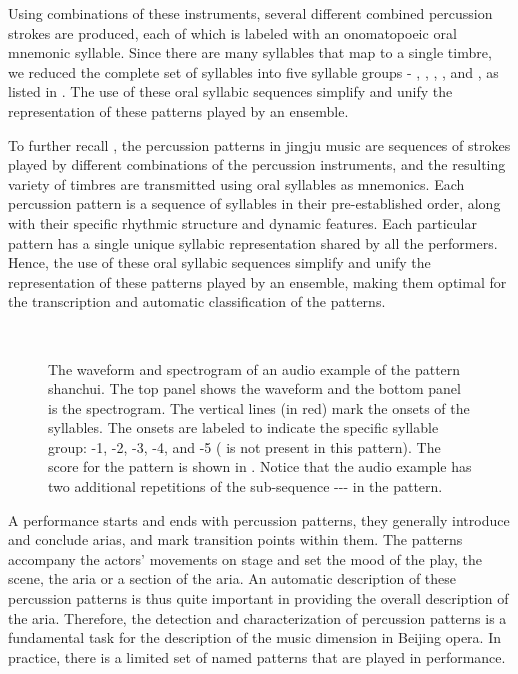 Using combinations of these instruments, several different combined percussion strokes are produced, each of which is labeled with an onomatopoeic oral mnemonic syllable. Since there are many syllables that map to a single timbre, we reduced the complete set of syllables into five syllable groups - , , , , and , as listed in . The use of these oral syllabic sequences simplify and unify the representation of these patterns played by an ensemble. 

To further recall , the percussion patterns in \gls{jingju} music are sequences of strokes played by different combinations of the percussion instruments, and the resulting variety of timbres are transmitted using oral syllables as mnemonics. Each percussion pattern is a sequence of syllables in their pre-established order, along with their specific rhythmic structure and dynamic features. Each particular pattern has a single unique syllabic representation shared by all the performers. Hence, the use of these oral syllabic sequences simplify and unify the representation of these patterns played by an ensemble, making them optimal for the transcription and automatic classification of the patterns.
\begin{figure}
\captionsetup[subfigure]{labelformat=empty}
\centering
{}\\ \vspace{-1cm}
\caption[Waveform and spectrogram of the pattern \gls{shanchui}]{The waveform and spectrogram of an audio example of the pattern \gls{shanchui}. The top panel shows the waveform and the bottom panel is the spectrogram. The vertical lines (in red) mark the onsets of the syllables. The onsets are labeled to indicate the specific syllable group: -1, -2, -3, -4, and -5 ( is not present in this pattern). The score for the pattern is shown in \protect{}. Notice that the audio example has two additional repetitions of the sub-sequence --- in the pattern.}\label{fig:bopercpatt:audio}
\end{figure}

A performance starts and ends with percussion patterns, they generally introduce and conclude arias, and mark transition points within them. The patterns accompany the actors' movements on stage and set the mood of the play, the scene, the aria or a section of the aria. An automatic description of these percussion patterns is thus quite important in providing the overall description of the aria. Therefore, the detection and characterization of percussion patterns is a fundamental task for the description of the music dimension in Beijing opera. In practice, there is a limited set of named patterns that are played in performance. 

